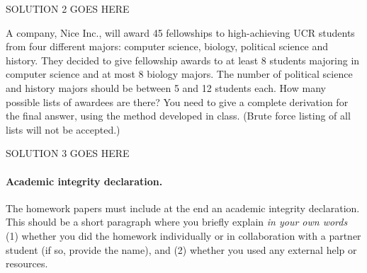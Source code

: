 \documentclass[11pt]{article}
\begin{document}

\begin{solution}
	SOLUTION 2 GOES HERE
\end{solution}

\newpage

\begin{problem}
	A company, Nice Inc., will award 45 fellowships to high-achieving UCR students from four different majors: computer science, biology, political science and history. They decided to give fellowship awards to at least 8 students majoring in computer science and at most 8 biology majors. The number of political science and history majors should be between 5 and 12 students each. How many possible lists of awardees are there? You need to give a complete derivation for the final answer, using the method developed in class. 
	(Brute force listing of all lists will not be accepted.)
	
\end{problem}
	


\begin{solution}
	SOLUTION 3 GOES HERE
\end{solution}


\newpage
\paragraph{Academic integrity declaration.}
The homework papers must include at the end an academic integrity declaration. This should be a short paragraph where you briefly explain 
\emph{in your own words}  (1) whether you did the homework individually or in collaboration with a partner student (if so, provide the name), 
and (2) whether you used any external help or resources. 

\end{document}
